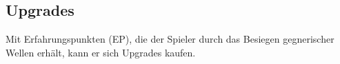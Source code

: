 \subsection{Upgrades}\label{sec:upgrades-list}

%

Mit Erfahrungspunkten (EP), die der Spieler durch das Besiegen gegnerischer
Wellen erhält, kann er sich Upgrades kaufen.

